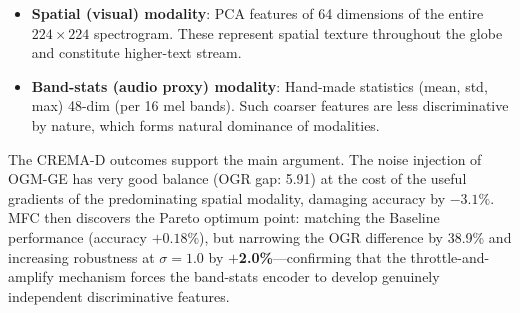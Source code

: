 \documentclass[10pt, twocolumn, letterpaper]{article}
\begin{document}
\begin{itemize}
    \item \textbf{Spatial (visual) modality}: PCA features of 64 dimensions of the entire $224\times224$ spectrogram. These represent spatial texture throughout the globe and constitute higher-text stream.
    \item \textbf{Band-stats (audio proxy) modality}: Hand-made statistics (mean, std, max) 48-dim (per 16 mel bands). Such coarser features are less discriminative by nature, which forms natural dominance of modalities.
\end{itemize}

\begin{table}[h]
\centering
{}
\caption{\textbf{Real-Data Benchmark: CREMA-D Emotion Recognition.} MFC achieves the highest test accuracy and the best robustness at $\sigma{=}1.0$. OGM-GE achieves the lowest OGR gap (5.91) through aggressive noise injection but suffers a \textbf{$-$3.1\%} accuracy penalty—confirming the over-correction problem. MFC reduces the OGR gap by 38.9\% over the Baseline with no accuracy cost.}
\label{tab:crema}
\end{table}

The CREMA-D outcomes support the main argument. The noise injection of OGM-GE has very good balance (OGR gap: 5.91) at the cost of the useful gradients of the predominating spatial modality, damaging accuracy by $-3.1\%$. MFC then discovers the Pareto optimum point: matching the Baseline performance (accuracy $+0.18\%$), but narrowing the OGR difference by 38.9\% and increasing robustness at $\sigma{=}1.0$ by \textbf{$+$2.0\%}---confirming that the throttle-and-amplify mechanism forces the band-stats encoder to develop genuinely independent discriminative features.
\end{document}
